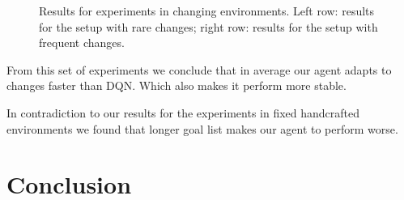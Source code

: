 \documentclass[runningheads]{llncs}
\begin{document}
\begin{figure}
  \centering
  \begin{minipage}{.49\linewidth}
    
    
    
    
  \end{minipage}
  \begin{minipage}{.49\linewidth}
    
    
    
    
  \end{minipage}

  \caption{Results for experiments in changing environments. Left row: results for the setup with rare changes; right row: results for the setup with frequent changes.}
\end{figure}

From this set of experiments we conclude that in average our agent adapts to changes faster than DQN. Which also makes it perform more stable.

In contradiction to our results for the experiments in fixed handcrafted environments we found that longer goal list makes our agent to perform worse.

\section{Conclusion}


\end{document}
